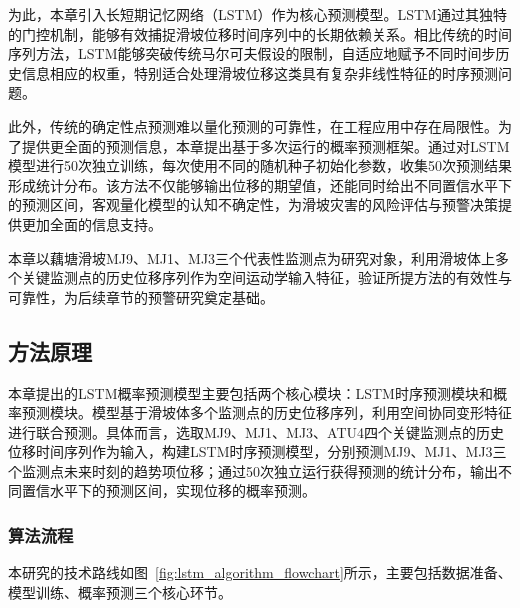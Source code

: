\documentclass[12pt,a4paper]{article}
\begin{document}
为此，本章引入长短期记忆网络（LSTM）作为核心预测模型。LSTM通过其独特的门控机制，能够有效捕捉滑坡位移时间序列中的长期依赖关系。相比传统的时间序列方法，LSTM能够突破传统马尔可夫假设的限制，自适应地赋予不同时间步历史信息相应的权重，特别适合处理滑坡位移这类具有复杂非线性特征的时序预测问题。

此外，传统的确定性点预测难以量化预测的可靠性，在工程应用中存在局限性。为了提供更全面的预测信息，本章提出基于多次运行的概率预测框架。通过对LSTM模型进行50次独立训练，每次使用不同的随机种子初始化参数，收集50次预测结果形成统计分布。该方法不仅能够输出位移的期望值，还能同时给出不同置信水平下的预测区间，客观量化模型的认知不确定性，为滑坡灾害的风险评估与预警决策提供更加全面的信息支持。

本章以藕塘滑坡MJ9、MJ1、MJ3三个代表性监测点为研究对象，利用滑坡体上多个关键监测点的历史位移序列作为空间运动学输入特征，验证所提方法的有效性与可靠性，为后续章节的预警研究奠定基础。


\subsection{方法原理}

本章提出的LSTM概率预测模型主要包括两个核心模块：LSTM时序预测模块和概率预测模块。模型基于滑坡体多个监测点的历史位移序列，利用空间协同变形特征进行联合预测。具体而言，选取MJ9、MJ1、MJ3、ATU4四个关键监测点的历史位移时间序列作为输入，构建LSTM时序预测模型，分别预测MJ9、MJ1、MJ3三个监测点未来时刻的趋势项位移；通过50次独立运行获得预测的统计分布，输出不同置信水平下的预测区间，实现位移的概率预测。

\subsubsection{算法流程}

本研究的技术路线如图~\ref{fig:lstm_algorithm_flowchart}所示，主要包括数据准备、模型训练、概率预测三个核心环节。
\end{document}
